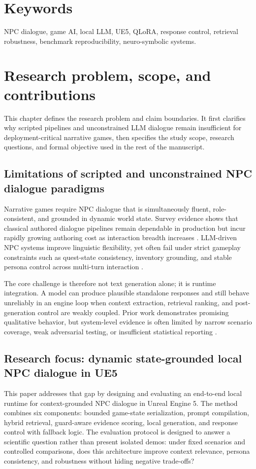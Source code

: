 ﻿\documentclass[a4paper,12pt]{article}
\begin{document}
\section*{Keywords}
{}
NPC dialogue, game AI, local LLM, UE5, QLoRA, response control, retrieval robustness, benchmark reproducibility, neuro-symbolic systems.

\section{Research problem, scope, and contributions}
This chapter defines the research problem and claim boundaries. It first clarifies why scripted pipelines and unconstrained LLM dialogue remain insufficient for deployment-critical narrative games, then specifies the study scope, research questions, and formal objective used in the rest of the manuscript.
\subsection{Limitations of scripted and unconstrained NPC dialogue paradigms}
Narrative games require NPC dialogue that is simultaneously fluent, role-consistent, and grounded in dynamic world state. Survey evidence shows that classical authored dialogue pipelines remain dependable in production but incur rapidly growing authoring cost as interaction breadth increases \cite{Gallotta2024Survey,Sweetser2024Scoping}. LLM-driven NPC systems improve linguistic flexibility, yet often fail under strict gameplay constraints such as quest-state consistency, inventory grounding, and stable persona control across multi-turn interaction \cite{Park2023GenerativeAgents,Gallotta2024Survey,Sweetser2024Scoping}.

The core challenge is therefore not text generation alone; it is runtime integration. A model can produce plausible standalone responses and still behave unreliably in an engine loop when context extraction, retrieval ranking, and post-generation control are weakly coupled. Prior work demonstrates promising qualitative behavior, but system-level evidence is often limited by narrow scenario coverage, weak adversarial testing, or insufficient statistical reporting \cite{Gallotta2024Survey,Rao2024Minecraft}.

\subsection{Research focus: dynamic state-grounded local NPC dialogue in UE5}
This paper addresses that gap by designing and evaluating an end-to-end local runtime for context-grounded NPC dialogue in Unreal Engine 5. The method combines six components: bounded game-state serialization, prompt compilation, hybrid retrieval, guard-aware evidence scoring, local generation, and response control with fallback logic. The evaluation protocol is designed to answer a scientific question rather than present isolated demos: under fixed scenarios and controlled comparisons, does this architecture improve context relevance, persona consistency, and robustness without hiding negative trade-offs?
\end{document}
